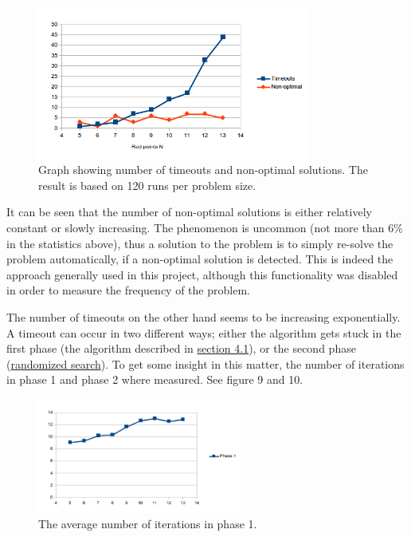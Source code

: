 \documentclass[a4paper,12pt]{article}
\begin{document}
\begin{figure}[!ht]
\begin{center}
\includegraphics[width=0.8\textwidth]{pictures/timeouts.png}
 \caption[Close up of \textit{Hemidactylus} sp.]
   {Graph showing number of timeouts and non-optimal solutions. The result is based on 120 runs per problem size.}
\end{center}
\end{figure}

It can be seen that the number of non-optimal solutions is either relatively constant or slowly increasing. The phenomenon is uncommon (not more than 6\% in the statistics above), thus a solution to the problem is to simply re-solve the problem automatically, if a non-optimal solution is detected. This is indeed the approach generally used in this project, although this functionality was disabled in order to measure the frequency of the problem.

The number of timeouts on the other hand seems to be increasing exponentially. A timeout can occur in two different ways; either the algorithm gets stuck in the first phase (the algorithm described in \hyperref[ref:Algorithm]{section 4.1}), or the second phase (\hyperref[sec:rand]{randomized search}). To get some insight in this matter, the number of iterations in phase 1 and phase 2 where measured. See figure 9 and 10.


\begin{figure}[!ht]
\begin{center}
\includegraphics[width=0.6\textwidth]{pictures/phase1iterations.png}
 \caption[Close up of \textit{Hemidactylus} sp.]
   {The average number of iterations in phase 1.}
\end{center}
\end{figure}
\end{document}

